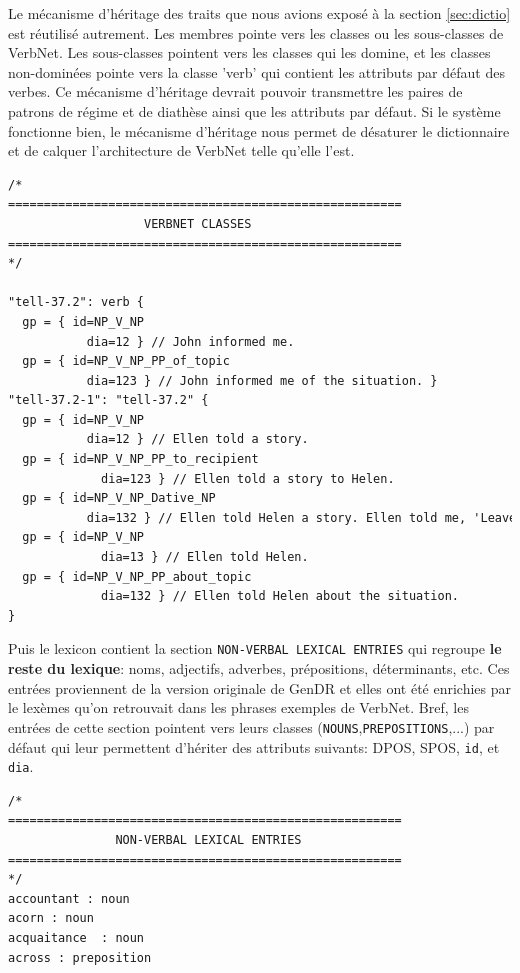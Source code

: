 Le mécanisme d'héritage des traits que nous avions exposé à la section \ref{sec:dictio} est réutilisé autrement. Les membres pointe vers les classes ou les sous-classes de VerbNet. Les sous-classes pointent vers les classes qui les domine, et les classes non-dominées pointe vers la classe 'verb' qui contient les attributs par défaut des verbes. Ce mécanisme d'héritage devrait pouvoir transmettre les paires de patrons de régime et de diathèse ainsi que les attributs par défaut. Si le système fonctionne bien, le mécanisme d'héritage nous permet de désaturer le dictionnaire et de calquer l'architecture de VerbNet telle qu'elle l'est.

\begin{minipage}{\linewidth}
\begin{lstlisting}[language=XML, caption = Partie: Classes de VerbNet]
/*
=======================================================
                   VERBNET CLASSES
=======================================================
*/

"tell-37.2": verb {
  gp = { id=NP_V_NP  
	       dia=12 } // John informed me.
  gp = { id=NP_V_NP_PP_of_topic  
	       dia=123 } // John informed me of the situation. }
"tell-37.2-1": "tell-37.2" {
  gp = { id=NP_V_NP  
	       dia=12 } // Ellen told a story.
  gp = { id=NP_V_NP_PP_to_recipient 
		     dia=123 } // Ellen told a story to Helen.
  gp = { id=NP_V_NP_Dative_NP   
	       dia=132 } // Ellen told Helen a story. Ellen told me, 'Leave the room.'
  gp = { id=NP_V_NP
		     dia=13 } // Ellen told Helen.
  gp = { id=NP_V_NP_PP_about_topic
		     dia=132 } // Ellen told Helen about the situation.
}
\end{lstlisting}
\end{minipage}

Puis le lexicon contient la section \texttt{NON-VERBAL LEXICAL ENTRIES} qui regroupe \textbf{le reste du lexique}: noms, adjectifs, adverbes, prépositions, déterminants, etc. Ces entrées proviennent de la version originale de GenDR \citep{lareau18} et elles ont été enrichies par le lexèmes qu'on retrouvait dans les phrases exemples de VerbNet. Bref, les entrées de cette section pointent vers leurs classes (\texttt{NOUNS},\texttt{PREPOSITIONS},...) par défaut qui leur permettent d'hériter des attributs suivants: \ac{DPOS}, \ac{SPOS}, \texttt{id}, et \texttt{dia}.

\begin{minipage}{\linewidth}
\begin{lstlisting}[language=XML, caption = Partie: Unités lexicales non-verbales]
/*
=======================================================
               NON-VERBAL LEXICAL ENTRIES     
=======================================================
*/
accountant : noun
acorn : noun
acquaitance  : noun
across : preposition
\end{lstlisting}
\end{minipage}

